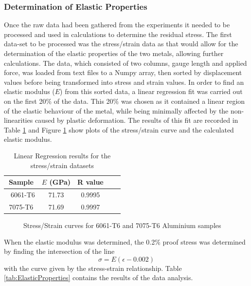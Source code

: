 \documentclass[11pt, oneside]{article}   	%
\begin{document}
\subsubsection{Determination of Elastic Properties}
Once the raw data had been gathered from the experiments it needed to be processed and used in calculations to determine the residual stress.
The first data-set to be processed was the stress/strain data as that would allow for the determination of the elastic properties of the two metals, allowing further calculations. The data, which consisted of two columns, gauge length and applied force, was loaded from text files to a Numpy array, then sorted by displacement values before being transformed into stress and strain values.
In order to find an elastic modulus ($E$) from this sorted data, a linear regression fit was carried out on the first 20\% of the data. This 20\% was chosen as it contained a linear region of the elastic behaviour of the metal, while being minimally affected by the non-linearities caused by plastic deformation. The results of this fit are recorded in Table \ref{tab:LinReg} and Figure \ref{fig:StressStrain} show plots of the stress/strain curve and the calculated elastic modulus.
\begin{table}[h!]
	\centering
	\caption{Linear Regression results for the stress/strain datasets}\label{tab:LinReg}
	\begin{tabular}[c]{c | c c c c}
	Sample & $E$ (\si{\giga\pascal}) & R value\\ \hline\
	6061-T6 & 71.73 & 0.9995 \\
	7075-T6 & 71.69 & 0.9997 \\
	\end{tabular}
\end{table}
\begin{figure}
	\centering
	\caption{Stress/Strain curves for 6061-T6 and 7075-T6 Aluminium samples}\label{fig:StressStrain}
	\scalebox{0.75}{}
	\scalebox{0.75}{}
\end{figure}
\begin{figure}
\centering
\scalebox{0.75}{}
\end{figure}
\begin{figure}
\centering
\scalebox{0.75}{}
\end{figure}
When the elastic modulus was determined, the 0.2\% proof stress was determined by finding the intersection of the line \[\sigma=E(\epsilon-0.002)\] with the curve given by the stress-strain relationship. Table \ref{tab:ElasticProperties} contains the results of the data analysis.
\end{document}
